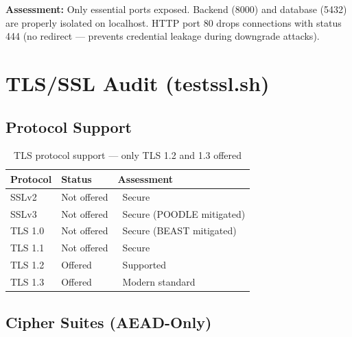 \documentclass[12pt,a4paper]{article}
\newcommand{\pass}{\textcolor{success}{\checkmark}}
\begin{document}
\textbf{Assessment:} Only essential ports exposed. Backend (8000) and database (5432) are properly isolated on localhost. HTTP port 80 drops connections with status 444 (no redirect --- prevents credential leakage during downgrade attacks).

\section{TLS/SSL Audit (testssl.sh)}

\subsection{Protocol Support}

\begin{table}[H]
\centering
\begin{tabular}{lll}
\toprule
\textbf{Protocol} & \textbf{Status} & \textbf{Assessment} \\
\midrule
SSLv2 & Not offered & \pass\ Secure \\
SSLv3 & Not offered & \pass\ Secure (POODLE mitigated) \\
TLS 1.0 & Not offered & \pass\ Secure (BEAST mitigated) \\
TLS 1.1 & Not offered & \pass\ Secure \\
TLS 1.2 & Offered & \pass\ Supported \\
TLS 1.3 & Offered & \pass\ Modern standard \\
\bottomrule
\end{tabular}
\caption{TLS protocol support --- only TLS 1.2 and 1.3 offered}
\end{table}

\subsection{Cipher Suites (AEAD-Only)}
\end{document}
